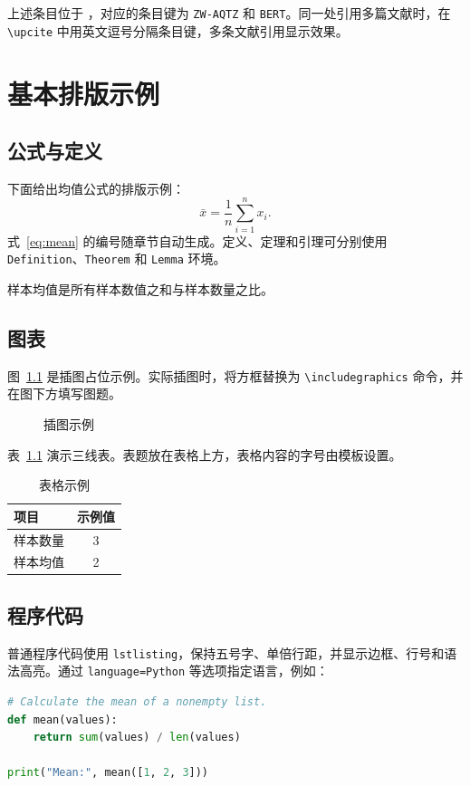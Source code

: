 上述条目位于 ，对应的条目键为 \verb|ZW-AQTZ| 和 \verb|BERT|。同一处引用多篇文献时，在 \verb|\upcite| 中用英文逗号分隔条目键，多条文献引用显示效果。

\chapter{基本排版示例}

\section{公式与定义}
下面给出均值公式的排版示例：
\begin{equation}
  \bar{x}=\frac{1}{n}\sum_{i=1}^{n}x_i.
  \label{eq:mean}
\end{equation}
式~\ref{eq:mean} 的编号随章节自动生成。定义、定理和引理可分别使用 \verb|Definition|、\verb|Theorem| 和 \verb|Lemma| 环境。
\begin{Definition}
样本均值是所有样本数值之和与样本数量之比。
\end{Definition}

\section{图表}
图~\ref{fig:placeholder} 是插图占位示例。实际插图时，将方框替换为 \verb|\includegraphics| 命令，并在图下方填写图题。
\begin{figure}[htbp]
  \centering
  \caption{插图示例}
  \label{fig:placeholder}
\end{figure}

表~\ref{tab:example} 演示三线表。表题放在表格上方，表格内容的字号由模板设置。
\begin{table}[htbp]
  \centering
  \caption{表格示例}
  \label{tab:example}
  \begin{tabular}{lc}
    \toprule
    项目 & 示例值 \\
    \midrule
    样本数量 & 3 \\
    样本均值 & 2 \\
    \bottomrule
  \end{tabular}
\end{table}

\section{程序代码}
普通程序代码使用 \verb|lstlisting|，保持五号字、单倍行距，并显示边框、行号和语法高亮。通过 \verb|language=Python| 等选项指定语言，例如：

\noindent\begin{minipage}{\linewidth}
\begin{lstlisting}[language=Python]
# Calculate the mean of a nonempty list.
def mean(values):
    return sum(values) / len(values)

print("Mean:", mean([1, 2, 3]))
\end{lstlisting}
\end{minipage}
